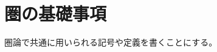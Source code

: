 \begingroup %
	\newcommand{\Hom}{\ensuremath{\myop{Hom}}}
	\newcommand{\End}{\ensuremath{\myop{End}}}
	\newcommand{\Nat}{\ensuremath{\myop{Nat}}}
	\newcommand{\dom}{\ensuremath{\myop{dom}}}
	\newcommand{\cod}{\ensuremath{\myop{cod}}}
	\newcommand{\onto}{\ensuremath{\myop{onto}}}
	\newcommand{\monic}{\ensuremath{\myop{monic}}}
	\newcommand{\epi}{\ensuremath{\myop{epi}}}
	\newcommand{\full}{\ensuremath{\myop{full}}}
	\newcommand{\op}{\ensuremath{\myop{op}}}
	\newcommand{\lcoset}[2]{\ensuremath{{#1}/{#2}}}
	\newcommand{\rcoset}[2]{\ensuremath{{#1}\backslash{#2}}}
%
\section{圏の基礎事項}\label{s1:圏の基礎事項} %
	圏論で共通に用いられる記号や定義を書くことにする。

